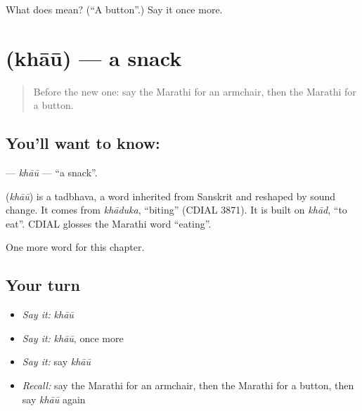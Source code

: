 \begin{tcolorbox}[breakable,colback=teal!4,colframe=teal!35!black,title={Before you move on}]
What does  mean? (\textquotedblleft{}A button\textquotedblright{}.) Say it once more.
\end{tcolorbox}
\section[\texorpdfstring{\mr{खाऊ} (khāū)}{खाऊ (khāū)}]{ (khāū) — a snack}

\label{lesson:MR-C208-khau}



\begin{quote}
Before the new one: say the Marathi for an armchair, then the Marathi for a button.
\end{quote}

\subsection*{You'll want to know: }
\textbf{} — \emph{khāū} — \textquotedblleft{}a snack\textquotedblright{}.

\begin{cousinweb}
\textbf{} (\emph{khāū}) is a tadbhava, a word inherited from Sanskrit and reshaped by sound change. It comes from \emph{khāduka}, \textquotedblleft{}biting\textquotedblright{} (CDIAL 3871). It is built on \emph{khād}, \textquotedblleft{}to eat\textquotedblright{}. CDIAL glosses the Marathi word \textquotedblleft{}eating\textquotedblright{}.
\end{cousinweb}

\begin{grammarlens}[title={What you've built}]
One more word for this chapter.
\end{grammarlens}

\subsection*{Your turn}
\begin{itemize}
\raggedright
  \item \emph{Say it:} \emph{khāū}
  \item \emph{Say it:} \emph{khāū}, once more
  \item \emph{Say it:} say \emph{khāū}
  \item \emph{Recall:} say the Marathi for an armchair, then the Marathi for a button, then say \emph{khāū} again
\end{itemize}

